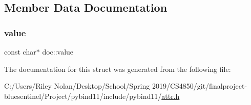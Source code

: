 \subsection{Member Data Documentation}
\mbox{\label{structdoc_a31cf9e16020b36cd9bdbff3680aca533}} 
\subsubsection{\texorpdfstring{value}{value}}
{\footnotesize\ttfamily const char$\ast$ doc\+::value}



The documentation for this struct was generated from the following file\+:\begin{DoxyCompactItemize}
\item 
C\+:/\+Users/\+Riley Nolan/\+Desktop/\+School/\+Spring 2019/\+C\+S4850/git/finalproject-\/bluesentinel/\+Project/pybind11/include/pybind11/\mbox{\hyperlink{attr_8h}{attr.\+h}}\end{DoxyCompactItemize}
